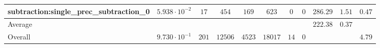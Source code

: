 \begin{tabular}{|l|c|c|c|c|c|c|c|c|c|c|}
subtraction:single\_prec\_subtraction\_0         & $ 5.938 \cdot 10^{-2} $ & $ 17     $ & $ 454   $ & $ 169  $ & $ 623   $ & $ 0  $ & $ 0 $ & $ 286.29      $ & $ 1.51    $ & $ 0.47    $ \\
\hline
Average                                          & $                     $ & $        $ & $       $ & $      $ & $       $ & $    $ & $   $ & $ 222.38      $ & $ 0.37    $ & $         $ \\
\hline
Overall                                          & $ 9.730 \cdot 10^{-1} $ & $ 201    $ & $ 12506 $ & $ 4523 $ & $ 18017 $ & $ 14 $ & $ 0 $ & $             $ & $         $ & $ 4.79    $ \\
\hline
\end{tabular}
